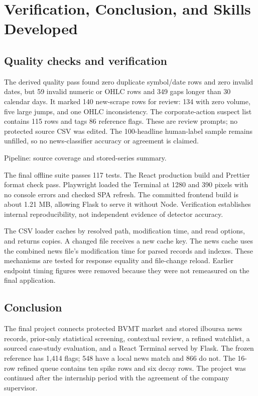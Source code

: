 \chapter{Verification, Conclusion, and Skills Developed}

\section{Quality checks and verification}
The derived quality pass found zero duplicate symbol/date rows and zero
invalid dates, but 59 invalid numeric or OHLC rows and 349 gaps longer
than 30 calendar days. It marked 140 new-scrape rows for review:
134 with zero volume, five large jumps, and one OHLC inconsistency.
The corporate-action suspect list contains 115 rows and tags 86
reference flags. These are review prompts; no protected source CSV
was edited. The 100-headline human-label sample remains unfilled, so
no news-classifier accuracy or agreement is claimed.

{Pipeline: source coverage and stored-series summary.}

The final offline suite passes 117 tests. The React production build
and Prettier format check pass. Playwright loaded the Terminal at 1280
and 390 pixels with no console errors and checked SPA refresh. The
committed frontend build is about 1.21 MB, allowing Flask to serve it
without Node. Verification establishes internal reproducibility, not
independent evidence of detector accuracy.

The CSV loader caches by resolved path, modification time, and read options,
and returns copies. A changed file receives a new cache key. The news cache
uses the combined news file's modification time for parsed records and
indexes. These mechanisms are tested for response equality and file-change
reload. Earlier endpoint timing figures were removed because they were not
remeasured on the final application.

\section{Conclusion}
The final project connects protected BVMT market and stored ilboursa news
records, prior-only statistical screening, contextual review, a refined
watchlist, a sourced case-study evaluation, and a React Terminal served by
Flask. The frozen reference has 1,414 flags; 548 have a local news match
and 866 do not. The 16-row refined queue contains ten spike rows and six
decay rows. The project was continued after the internship period with
the agreement of the company supervisor.

